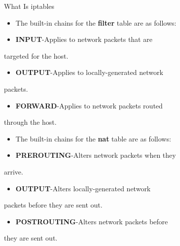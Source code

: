 \begin{frame}[t,allowframebreaks]{What Is iptables}
  \fontsize{15}{18}\selectfont
  \begin{itemize}
    \item The built-in chains for the \textcolor{CommandGreen}{\bfseries filter} table are as follows:
    \item \textcolor{WarningColor}{\bfseries INPUT}-Applies to network packets that are
  \end{itemize}
  targeted for the host.\par
  \begin{itemize}
    \item \textcolor{WarningColor}{\bfseries OUTPUT}-Applies to locally-generated network
  \end{itemize}
  packets.\par
  \begin{itemize}
    \item \textcolor{WarningColor}{\bfseries FORWARD}-Applies to network packets routed
  \end{itemize}
  through the host.\par
  \begin{itemize}
    \item The built-in chains for the \textcolor{CommandGreen}{\bfseries nat} table are as follows:
    \item \textcolor{WarningColor}{\bfseries PREROUTING}-Alters network packets when they
  \end{itemize}
  arrive.\par
  \begin{itemize}
    \item \textcolor{WarningColor}{\bfseries OUTPUT}-Alters locally-generated network
  \end{itemize}
  packets before they are sent out.\par
  \begin{itemize}
    \item \textcolor{WarningColor}{\bfseries POSTROUTING}-Alters network packets before
  \end{itemize}
  they are sent out.\par
\end{frame}
